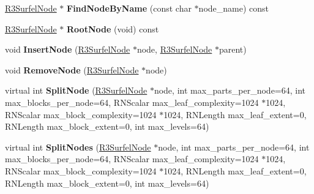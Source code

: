 \begin{DoxyCompactItemize}
\item 
\hyperlink{class_r3_surfel_node}{R3\+Surfel\+Node} $\ast$ {\bfseries Find\+Node\+By\+Name} (const char $\ast$node\+\_\+name) const \hypertarget{class_r3_surfel_tree_a4030bcf14d87c959a0b0edffa9a3061b}{}\label{class_r3_surfel_tree_a4030bcf14d87c959a0b0edffa9a3061b}

\item 
\hyperlink{class_r3_surfel_node}{R3\+Surfel\+Node} $\ast$ {\bfseries Root\+Node} (void) const \hypertarget{class_r3_surfel_tree_a282fdf7fed3b62812c157bb9c7fcf381}{}\label{class_r3_surfel_tree_a282fdf7fed3b62812c157bb9c7fcf381}

\item 
void {\bfseries Insert\+Node} (\hyperlink{class_r3_surfel_node}{R3\+Surfel\+Node} $\ast$node, \hyperlink{class_r3_surfel_node}{R3\+Surfel\+Node} $\ast$parent)\hypertarget{class_r3_surfel_tree_a113928fb8f7eafaa88c29275c05c5a1b}{}\label{class_r3_surfel_tree_a113928fb8f7eafaa88c29275c05c5a1b}

\item 
void {\bfseries Remove\+Node} (\hyperlink{class_r3_surfel_node}{R3\+Surfel\+Node} $\ast$node)\hypertarget{class_r3_surfel_tree_aa83d466eaf1ed6e340665acd50d3f097}{}\label{class_r3_surfel_tree_aa83d466eaf1ed6e340665acd50d3f097}

\item 
virtual int {\bfseries Split\+Node} (\hyperlink{class_r3_surfel_node}{R3\+Surfel\+Node} $\ast$node, int max\+\_\+parts\+\_\+per\+\_\+node=64, int max\+\_\+blocks\+\_\+per\+\_\+node=64, R\+N\+Scalar max\+\_\+leaf\+\_\+complexity=1024 $\ast$1024, R\+N\+Scalar max\+\_\+block\+\_\+complexity=1024 $\ast$1024, R\+N\+Length max\+\_\+leaf\+\_\+extent=0, R\+N\+Length max\+\_\+block\+\_\+extent=0, int max\+\_\+levels=64)\hypertarget{class_r3_surfel_tree_a2bc5a8ce8c56a0a2e802e9d51b54b0ba}{}\label{class_r3_surfel_tree_a2bc5a8ce8c56a0a2e802e9d51b54b0ba}

\item 
virtual int {\bfseries Split\+Nodes} (\hyperlink{class_r3_surfel_node}{R3\+Surfel\+Node} $\ast$node, int max\+\_\+parts\+\_\+per\+\_\+node=64, int max\+\_\+blocks\+\_\+per\+\_\+node=64, R\+N\+Scalar max\+\_\+leaf\+\_\+complexity=1024 $\ast$1024, R\+N\+Scalar max\+\_\+block\+\_\+complexity=1024 $\ast$1024, R\+N\+Length max\+\_\+leaf\+\_\+extent=0, R\+N\+Length max\+\_\+block\+\_\+extent=0, int max\+\_\+levels=64)\hypertarget{class_r3_surfel_tree_a42f8c29fb52d5bbfeea2a729d03f9341}{}\label{class_r3_surfel_tree_a42f8c29fb52d5bbfeea2a729d03f9341}


\end{DoxyCompactItemize}

